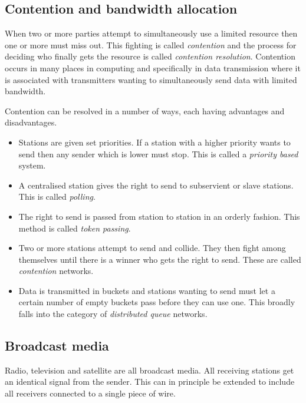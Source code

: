 \subsection{Contention and bandwidth allocation}

When two or more parties attempt to simultaneously use a limited
resource then one or more must miss out.  This fighting is called {\em
contention} and the process for deciding who finally gets the resource
is called {\em contention resolution}.  Contention occurs in many
places in computing and specifically in data transmission where it is
associated with transmitters wanting to simultaneously send data with
limited bandwidth.

Contention can be resolved in a number of ways, each having advantages
and disadvantages.

\begin{itemize}

\item Stations are given set priorities.  If a station with a higher
priority wants to send then any sender which is lower must stop.  This
is called a {\em priority based} system.

\item A centralised station gives the right to send to subservient or
slave stations.  This is called {\em polling}.

\item The right to send is passed from station to station in an
orderly fashion.  This method is called {\em token passing}.

\item Two or more stations attempt to send and collide.  They then
fight among themselves until there is a winner who gets the right
to send.  These are called {\em contention} networks.

\item Data is transmitted in buckets and stations wanting to send must
let a certain number of empty buckets pass before they can use one.
This broadly falls into the category of {\em distributed queue}
networks.

\end{itemize}

\subsection{Broadcast media}

Radio, television and satellite are all broadcast media.  All
receiving stations get an identical signal from the sender.  This can
in principle be extended to include all receivers connected to a
single piece of wire.

